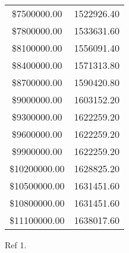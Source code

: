 \documentclass{article}
\begin{document}
\begin{table}[h!]
\begin{tabular}{cc}
\$7500000.00 & 1522926.40\\
\$7800000.00 & 1533631.60\\
\$8100000.00 & 1556091.40\\
\$8400000.00 & 1571313.80\\
\$8700000.00 & 1590420.80\\
\$9000000.00 & 1603152.20\\
\$9300000.00 & 1622259.20\\
\$9600000.00 & 1622259.20\\
\$9900000.00 & 1622259.20\\
\$10200000.00 & 1628825.20\\
\$10500000.00 & 1631451.60\\
\$10800000.00 & 1631451.60\\
\$11100000.00 & 1638017.60\\
\bottomrule
\end{tabular}
\end{table}

\newpage

\begin{thebibliography}{9}
\item Ref 1.
\end{thebibliography}
\end{document}
